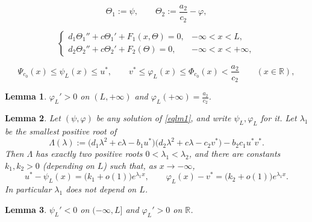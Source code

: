 \documentclass[10pt,a4paper]{amsart}
\newtheorem{lemma}{Lemma}
\begin{document}
\begin{equation}\label{cooper}
	\Theta_1:=\psi,\qquad \Theta_2:=\frac{a_2}{c_2}-\varphi ,
\end{equation}

\begin{equation}\label{eqcoop}
	\begin{cases}
		d_1\Theta_1''+c\Theta_1'+F_1(x,\Theta)=0, & -\infty<x<L,\\
		d_2\Theta_2''+c\Theta_2'+F_2(\Theta)=0, & -\infty<x<+\infty,
	\end{cases}
\end{equation}

	\begin{equation}\label{s0}
		\Psi_{c_0}(x) \le \psi_L(x) \le u^*,
		\qquad
		v^* \le \varphi_L(x) \le \Phi_{c_0}(x) < \frac{a_2}{c_2}
		\qquad (x\in \mathbb{R}),
	\end{equation}

\begin{lemma}\label{lm:phi_infty}
	$\varphi_L'>0$ on $(L,+\infty)$ and $\varphi_L(+\infty)=\frac{a_2}{c_2}$.
\end{lemma}

\begin{lemma}\label{lm:asym}
	Let $(\psi,\varphi)$ be any solution of \eqref{eqlm1}, and write
	$\psi_L,\varphi_L$ for it. Let $\lambda_1$ be the smallest positive root of
	\begin{equation}\label{charac}
		\Lambda(\lambda):=\big(d_1\lambda^2+c\lambda-b_1u^*\big)\big(d_2\lambda^2+c\lambda-c_2v^*\big)-b_2c_1u^*v^* .
	\end{equation}
	Then $\Lambda$ has exactly two positive roots $0<\lambda_1<\lambda_2$, and
	there are constants $k_1,k_2>0$ (depending on $L$) such that, as
	$x\to-\infty$,
	\begin{equation}\label{asym}
		u^*-\psi_L(x)=\big(k_1+o(1)\big)e^{\lambda_1x},
		\qquad
		\varphi_L(x)-v^*=\big(k_2+o(1)\big)e^{\lambda_1x}.
	\end{equation}
	In particular $\lambda_1$ does not depend on $L$.
\end{lemma}

\begin{lemma}\label{lm:mono}
	$\psi_L'<0$ on $(-\infty,L]$ and $\varphi_L'>0$ on $\mathbb{R}$.
\end{lemma}
\end{document}
